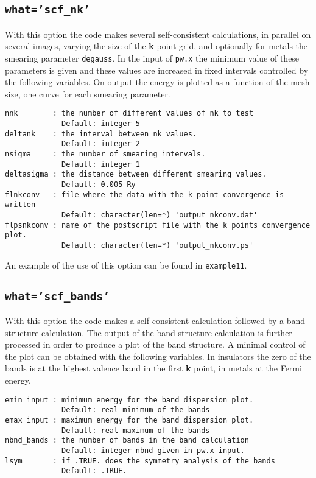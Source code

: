 \documentclass[12pt,a4paper]{article}
\begin{document}
\subsection{\texttt{what='scf\_nk'}}
With this option the code makes several self-consistent calculations, 
in parallel on several images, varying the size of the {\bf k}-point grid, 
and optionally for metals the smearing parameter \texttt{degauss}. In the 
input of \texttt{pw.x} the minimum value of these parameters is given and 
these values are increased in fixed intervals controlled by the following 
variables. On output the energy is plotted as a function of the mesh size, 
one curve for each smearing parameter.

\begin{verbatim}
nnk        : the number of different values of nk to test
             Default: integer 5
deltank    : the interval between nk values.
             Default: integer 2
nsigma     : the number of smearing intervals.
             Default: integer 1 
deltasigma : the distance between different smearing values.
             Default: 0.005 Ry
flnkconv   : file where the data with the k point convergence is written
             Default: character(len=*) 'output_nkconv.dat'
flpsnkconv : name of the postscript file with the k points convergence plot.
             Default: character(len=*) 'output_nkconv.ps'
\end{verbatim}
An example of the use of this option can be found in \texttt{example11}.

\subsection{\texttt{what='scf\_bands'}}
With this option the code makes a self-consistent calculation followed 
by a band structure calculation. The output of the band structure calculation
is further processed in order to produce a plot of the band structure.
A minimal control of the plot can be obtained with the following variables.
In insulators the zero of the bands is at the highest valence band in the
first {\bf k} point, in metals at the Fermi energy. 

\begin{verbatim}
emin_input : minimum energy for the band dispersion plot.
             Default: real minimum of the bands
emax_input : maximum energy for the band dispersion plot.
             Default: real maximum of the bands
nbnd_bands : the number of bands in the band calculation
             Default: integer nbnd given in pw.x input.
lsym       : if .TRUE. does the symmetry analysis of the bands
             Default: .TRUE.
\end{verbatim}
\end{document}
